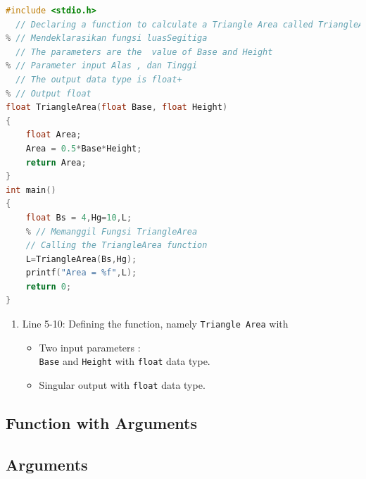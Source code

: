 \begin{lstlisting}[language=c]
	#include <stdio.h>
  // Declaring a function to calculate a Triangle Area called TriangleArea  
% // Mendeklarasikan fungsi luasSegitiga
  // The parameters are the  value of Base and Height
% // Parameter input Alas , dan Tinggi
  // The output data type is float+
% // Output float
float TriangleArea(float Base, float Height)
{
	float Area;
	Area = 0.5*Base*Height;
	return Area;
}
int main()
{
	float Bs = 4,Hg=10,L;
    % // Memanggil Fungsi TriangleArea
	// Calling the TriangleArea function
    L=TriangleArea(Bs,Hg);
	printf("Area = %f",L);
	return 0;
}
\end{lstlisting}
\begin{enumerate}
    \item Line 5-10: Defining the function, namely \verb|Triangle Area| with
          \begin{itemize}
              \item Two input parameters :\\
                    \verb*|Base| and \verb*|Height|  with \verb*|float| data type.
              \item Singular output with \verb*|float| data type.
          \end{itemize}
\end{enumerate}
\subsection{Function with Arguments}

\subsection{Arguments}

